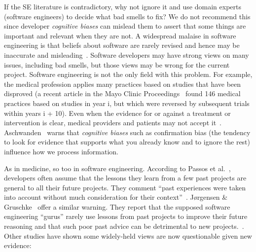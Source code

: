 \documentclass[twocolumn,5p]{elsarticle}
\theoremstyle{break}
\begin{document}
	If the SE literature is contradictory, why not ignore it and use domain experts (software engineers) to decide
	what bad smells to fix? We do not recommend this since developer {\em cognitive biases} can mislead them to
	assert that some things are important and relevant when they are not. 
	A widespread malaise in software engineering is that
	beliefs about software are rarely revised and hence may be
	inaccurate and 
	misleading~\cite{passos11,jorgensen09,mei15,me16phase,prem16}. Software developers may have strong views on many issues, including bad smells, but those views may be wrong for the current
	project.
	Software engineering is not the only field with this problem.
	For example, the medical profession applies many practices based on studies that have been disproved (a recent article in the Mayo Clinic Proceedings~\cite{prasad13} found 146 medical practices based on studies in year i, but which were reversed by subsequent trials within years i + 10). Even when the evidence for or against a treatment or intervention is clear, medical providers and patients may not accept it~\cite{aschwanden10}. Aschwanden~\cite{aschwanden15} warns that {\em cognitive biases} such as confirmation bias (the tendency to look for evidence that supports what you already know and to ignore the rest) influence how we process information.
	
	As in medicine, so too in software engineering.
	According to Passos et al.~\cite{passos11},  developers often  assume that the lessons they learn from a few past projects are general to all their future projects. They comment ``past experiences were taken into account without much consideration for their context''~\cite{passos11}.  J{\o}rgensen \& Gruschke~\cite{jorgensen09} offer a similar warning. They report that the supposed software engineering ``gurus'' rarely use lessons from past projects to improve their future reasoning and that such poor past advice can be detrimental to new projects.~\cite{jorgensen09}. Other studies have shown some widely-held views are   now questionable given new evidence:
	
\end{document}
